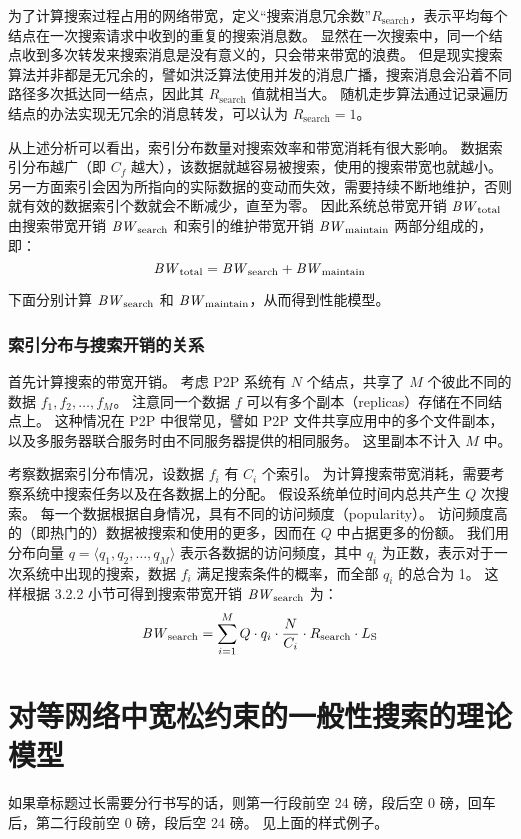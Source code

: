 \documentclass{thuthesis}
\begin{document}
为了计算搜索过程占用的网络带宽，定义“搜索消息冗余数”$R_{\text{search}}$，表示平均每个结点在一次搜索请求中收到的重复的搜索消息数。
显然在一次搜索中，同一个结点收到多次转发来搜索消息是没有意义的，只会带来带宽的浪费。
但是现实搜索算法并非都是无冗余的，譬如洪泛算法使用并发的消息广播，搜索消息会沿着不同路径多次抵达同一结点，因此其 $R_{\text{search}}$ 值就相当大。
随机走步算法通过记录遍历结点的办法实现无冗余的消息转发，可以认为 $R_{\text{search}} = 1$。

从上述分析可以看出，索引分布数量对搜索效率和带宽消耗有很大影响。
数据索引分布越广（即 $C_f$ 越大），该数据就越容易被搜索，使用的搜索带宽也就越小。
另一方面索引会因为所指向的实际数据的变动而失效，需要持续不断地维护，否则就有效的数据索引个数就会不断减少，直至为零。
因此系统总带宽开销 $\mathit{BW}_{\text{total}}$ 由搜索带宽开销 $\mathit{BW}_{\text{search}}$ 和索引的维护带宽开销 $\mathit{BW}_{\text{maintain}}$ 两部分组成的，即：
\begin{equation}
  \mathit{BW}_{\text{total}} = \mathit{BW}_{\text{search}} + \mathit{BW}_{\text{maintain}}
\end{equation}

下面分别计算 $\mathit{BW}_{\text{search}}$ 和 $\mathit{BW}_{\text{maintain}}$，从而得到性能模型。


\subsection{索引分布与搜索开销的关系}

首先计算搜索的带宽开销。
考虑 P2P 系统有 $N$ 个结点，共享了 $M$ 个彼此不同的数据 $f_1, f_2, \dots, f_M$。
注意同一个数据 $f$ 可以有多个副本（replicas）存储在不同结点上。
这种情况在 P2P 中很常见，譬如 P2P 文件共享应用中的多个文件副本，以及多服务器联合服务时由不同服务器提供的相同服务。
这里副本不计入 $M$ 中。

考察数据索引分布情况，设数据 $f_i$ 有 $C_i$ 个索引。
为计算搜索带宽消耗，需要考察系统中搜索任务以及在各数据上的分配。
假设系统单位时间内总共产生 $Q$ 次搜索。
每一个数据根据自身情况，具有不同的访问频度（popularity）。
访问频度高的（即热门的）数据被搜索和使用的更多，因而在 $Q$ 中占据更多的份额。
我们用分布向量 $q = \langle q_1, q_2 , \dots, q_M \rangle$ 表示各数据的访问频度，其中 $q_i$ 为正数，表示对于一次系统中出现的搜索，数据 $f_i$ 满足搜索条件的概率，而全部 $q_i$ 的总合为 1。
这样根据 3.2.2 小节可得到搜索带宽开销 $\mathit{BW}_{\text{search}}$ 为：
\begin{equation}
  \mathit{BW}_{\text{search}} = \sum_{i=1}^M Q \cdot q_i \cdot \frac{N}{C_i} \cdot R_{\text{search}} \cdot L_{\text{S}}
\end{equation}




\chapter{对等网络中宽松约束的一般性搜索的理论模型}

如果章标题过长需要分行书写的话，则第一行段前空 24 磅，段后空 0 磅，回车后，第二行段前空 0 磅，段后空 24 磅。
见上面的样式例子。



\clearpage
\OMIT
\end{document}
